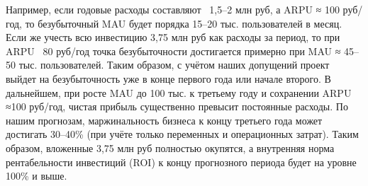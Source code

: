 \noindent Например, если годовые расходы составляют ~1,5–2 млн руб, а ARPU ≈ 100 руб/год, то безубыточный MAU будет порядка 15–20 тыс. пользователей в месяц. Если же учесть всю инвестицию 3,75 млн руб как расходы за период, то при ARPU ~80 руб/год точка безубыточности достигается примерно при MAU ≈ 45–50 тыс. пользователей. Таким образом, с учётом наших допущений проект выйдет на безубыточность уже в конце первого года или начале второго. В дальнейшем, при росте MAU до 100 тыс. к третьему году и сохранении ARPU ≈100 руб/год, чистая прибыль существенно превысит постоянные расходы. По нашим прогнозам, маржинальность бизнеса к концу третьего года может достигать 30–40\% (при учёте только переменных и операционных затрат). Таким образом, вложенные 3,75 млн руб полностью окупятся, а внутренняя норма рентабельности инвестиций (ROI) к концу прогнозного периода будет на уровне 100\% и выше.

